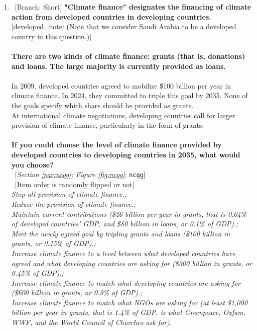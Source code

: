 \documentclass[12pt,english]{article}
\begin{document}
\begin{bibunit}
\begin{enumerate}[resume]
\item ~[Branch: Short] \label{q:ncqg} \textbf{"Climate finance" designates the financing of climate action from developed countries in developing countries.} [developed\_note: (Note that we consider Saudi Arabia to be a developed country in this question.)]\\\\\textbf{There are two kinds of climate finance: grants (that is, donations) and loans. The large majority is currently provided as loans.~}\\\\In 2009, developed countries agreed to mobilize \$100 billion per year in climate finance. In 2024, they committed to triple this goal by 2035. None of the goals specify which share should be provided as grants.~\\At international climate negotiations, developing countries call for larger provision of climate finance, particularly in the form of grants.\\\\\textbf{If you could choose the level of climate finance provided by developed countries to developing countries in 2035, what would you choose?}\\ 
~[\textit{Section \ref{par:ncqg}; Figure \ref{fig:ncqg}}; 
\verb|ncqg|]\\
~[Item order is randomly flipped or not]
  \\ \textit{Stop all provision of climate finance.; \\Reduce the provision of climate finance.; \\Maintain current contributions (\$26 billion per year in grants, that is 0.04\% of developed countries' GDP, and \$80 billion in loans, or 0.1\% of GDP).; \\ Meet the newly agreed goal by tripling grants and loans (\$100 billion in grants, or 0.15\% of GDP).; \\ Increase climate finance to a level between what developed countries have agreed and what developing countries are asking for (\$300 billion in grants, or 0.45\% of GDP).; \\Increase climate finance to match what developing countries are asking for (\$600 billion in grants, or 0.9\% of GDP).; \\Increase climate finance to match what NGOs are asking for (at least \$1,000 billion per year in grants, that is 1.4\% of GDP, is what Greenpeace, Oxfam, WWF, and the World Council of Churches ask for).}


\end{enumerate}
\end{bibunit}
\end{document}
